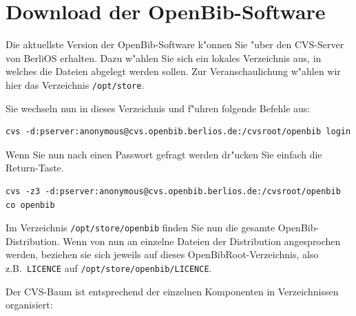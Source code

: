\documentclass[11pt, twoside, a4paper, BCOR8mm, DIV12, bibtotoc,idxtotoc]{scrbook}
\begin{document}
\chapter{Download der OpenBib-Software}

Die aktuellste Version der OpenBib-Software k"onnen Sie "uber den
CVS-Server von BerliOS erhalten. Dazu w"ahlen Sie sich ein lokales
Verzeichnis aus, in welches die Dateien abgelegt werden sollen. Zur
Veranschaulichung w"ahlen wir hier das Verzeichnis \texttt{/opt/store}.

Sie wechseln nun in dieses Verzeichnis und f"uhren folgende Befehle
aus: 

\begin{verbatim}
cvs -d:pserver:anonymous@cvs.openbib.berlios.de:/cvsroot/openbib login
\end{verbatim}

Wenn Sie nun nach einen Passwort gefragt werden dr"ucken Sie einfach
die Return-Taste.

\begin{verbatim}
cvs -z3 -d:pserver:anonymous@cvs.openbib.berlios.de:/cvsroot/openbib co openbib
\end{verbatim}

Im Verzeichnis \texttt{/opt/store/openbib} finden Sie nun die gesamte
OpenBib-Distribution. Wenn von nun an einzelne Dateien der
Distribution angesprochen werden, beziehen sie sich jeweils auf dieses
OpenBibRoot-Verzeichnis, also z.B.~\texttt{LICENCE} auf \texttt{/opt/store/openbib/LICENCE}.

Der CVS-Baum ist entsprechend der einzelnen Komponenten in
Verzeichnissen organisiert:
\end{document}
